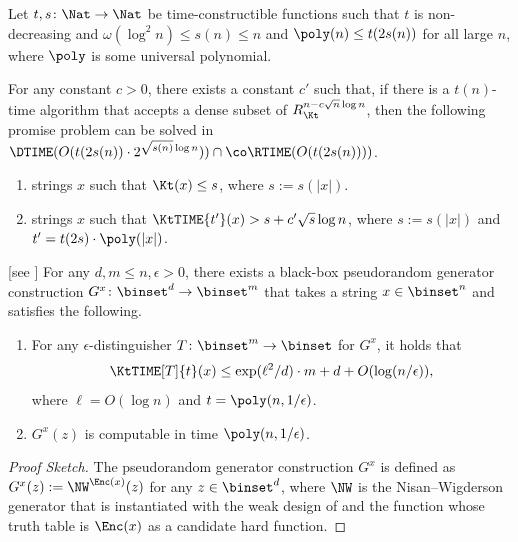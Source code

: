 \documentclass{toc}
\begin{document}
\begin{theorem}
  \label{thm_WorstToAverageForMKtP}
  Let $t, s \colon \Nat \to \Nat$ be time-constructible functions such that
  $t$ is non-decreasing and
  $\omega(\log^2 n) \le s(n) \le n$
  and
  $\poly(n) \le t(2 s(n))$
  for all large $n$,
  where $\poly$ is some universal polynomial.

  For any constant $c > 0$, there exists a constant $c'$
  such that,
  if
  there is a $t(n)$-time algorithm that accepts a dense subset of $R_{\Kt}^{n - c \sqrt{n} \log n}$,
  then
  the following promise problem can be solved in $\DTIME(O(t(2 s(n)) \cdot 2^{\sqrt{s(n)} \log n})) \cap \co\RTIME(O(t(2 s(n))))$.
  \begin{enumerate}
    \item
          [\Yes:]
          strings $x$ such that
          $\Kt(x) \le s$, where $s := s(|x|)$.
    \item
          [\No:]
          strings $x$ such that
          $\KtTIME{t'}(x) > s + c' \sqrt{s} \log n$,
          where
          $s := s(|x|)$
          and $t' = t(2 s) \cdot \poly(|x|)$.
  \end{enumerate}
\end{theorem}

\begin{lemma}
  [see \cite{Hirahara18_focs_conf}] %
  \label{lemma_NWwithEnc}
  For any $d, m \le n, \epsilon > 0$,
  there exists a black-box pseudorandom generator construction $G^{x} \colon \binset^d \to \binset^m$
  that takes a string $x \in \binset^{n}$ and satisfies the following.
  \begin{enumerate}
    \item
          For any $\epsilon$-distinguisher $T \colon \binset^m \to \binset$ for $G^x$,
          it holds that
          $$\KtTIME[T]{t}(x) \le \exp(\ell^2 / d) \cdot m + d + O(\log (n / \epsilon)),$$ where $\ell = O(\log n)$ and $t = \poly(n, 1 / \epsilon)$.
    \item
          $G^x(z)$ is computable in time $\poly(n, 1 / \epsilon)$.
  \end{enumerate}
\end{lemma}
\begin{proof}
  [Proof Sketch]
  The pseudorandom generator construction $G^x$ is defined as
  $G^x(z) := \NW^{\Enc(x)}(z)$ for any $z \in \binset^d$,
  where $\NW$ is the Nisan--Wigderson generator \cite{NisanW94_jcss_journals} that is instantiated with the weak design of \cite{RazRV02_jcss_journals}
  and the function whose truth table is $\Enc(x)$ as a candidate hard function.
\end{proof}
\end{document}
